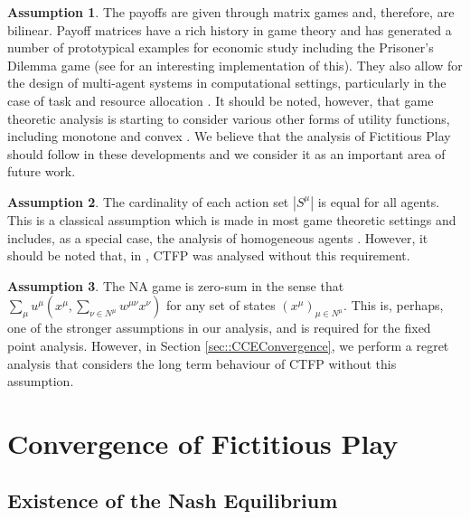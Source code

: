 \documentclass{article}
\theoremstyle{definition}
\newtheorem{assumption}{Assumption}
\newcommand{\actionset}[1]{S^{#1}}
\newcommand{\wmunu}{w^{\mu \nu}}
\newcommand{\xmu}{x^{\mu}}
\newcommand{\xnu}{x^{\nu}}
\newcommand{\weightedsum}{ \sum_{\nu \in N^\mu} \wmunu \xnu}
\begin{document}
  \begin{assumption}
    The payoffs are given through matrix games and, therefore, are bilinear. Payoff matrices
    have a rich history in game theory and has generated a number of prototypical examples for
    economic study including the Prisoner's Dilemma game (see \cite{Axelrod} for an interesting
    implementation of this). They also allow for the design of multi-agent systems in
    computational settings, particularly in the case of task and resource allocation \cite{AGT
    and some of the Applied Game Theory Papers}. It should be noted, however, that game
    theoretic analysis is starting to consider various other forms of utility functions,
    including monotone \cite{Maryam} and convex \cite{Parise}. We believe that the analysis of
    Fictitious Play should follow in these developments and we consider it as an important area
    of future work.
  \end{assumption}

  \begin{assumption}
    The cardinality of each action set $|\actionset{\mu}|$ is equal for all agents. This is
    a classical assumption which is made in most game theoretic settings and includes, as a
    special case, the analysis of homogeneous agents \cite{}. However, it should be noted that,
    in \cite{Ewerhart}, CTFP was analysed without this requirement.  
  \end{assumption}

  \begin{assumption}
    The NA game is zero-sum in the sense that $\sum_{\mu} u^\mu(\xmu, \weightedsum)$ for any set
    of states $(x^\mu)_{\mu \in N^\mu}$. This is, perhaps, one of the stronger assumptions in
    our analysis, and is required for the fixed point analysis. However, in Section
    \ref{sec::CCEConvergence}, we perform a regret analysis that considers the long term
    behaviour of CTFP without this assumption.
  \end{assumption}

\section{Convergence of Fictitious Play}

  \subsection{Existence of the Nash Equilibrium}
  \label{sec::ExistenceofNE}
  
\end{document}
